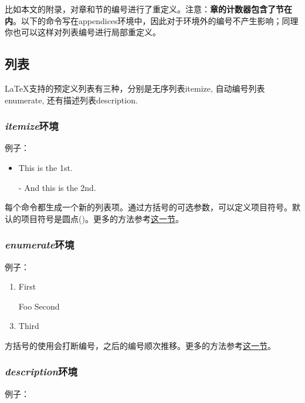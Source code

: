 {比如本文的附录，对章和节的编号进行了重定义。注意：\textbf{章的计数器包含了节在内}。以下的命令写在appendices环境中，因此对于环境外的编号不产生影响；同理你也可以这样对列表编号进行局部重定义。
\begin{latex}{}
\renewcommand{\thechapter}{\Alph{chapter}}
\renewcommand{\thesection}
    {\thechapter-\arabic{section}}
\end{latex}

\subsection{列表}
\LaTeX 支持的预定义列表有三种，分别是无序列表itemize, 自动编号列表enumerate, 还有描述列表description.

\subsubsection{\textit{itemize}环境}
例子：

\begin{codeshow}
\begin{itemize}
  \item This is the 1st.
  \item[-] And this is the 2nd.
\end{itemize}
\end{codeshow}

每个\latexline{\\item}命令都生成一个新的列表项。通过方括号的可选参数，可以定义项目符号。默认的项目符号是圆点(\latexline{\\textbullet})。更多的方法参考\hyperref[sec:list]{这一节}。

\subsubsection{\textit{enumerate}环境}
例子：

\begin{codeshow}
\begin{enumerate}
  \item First
  \item[Foo] Second
  \item Third
\end{enumerate}
\end{codeshow}

方括号的使用会打断编号，之后的编号顺次推移。更多的方法参考\hyperref[sec:list]{这一节}。

\subsubsection{\textit{description}环境}
例子：

}
